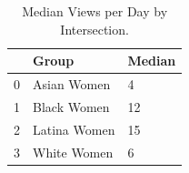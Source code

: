 \begin{table}[htbp]
\centering
\caption{Median Views per Day by Intersection.}
\label{tab:eda_views_per_day_by_group}
\begin{tabular}{lll}
\toprule
 & Group & Median \\
\midrule
0 & Asian Women & 4 \\
1 & Black Women & 12 \\
2 & Latina Women & 15 \\
3 & White Women & 6 \\
\bottomrule
\end{tabular}

\end{table}